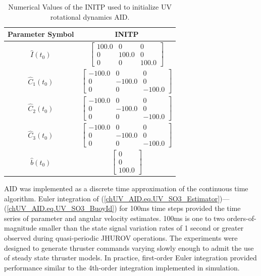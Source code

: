 \begin{table}[htbp]
\ssp
\caption{Numerical Values of the \ac{INITP} used to initialize \ac{UV} rotational dynamics \ac{AID}.}
\begin{center}
\begin{tabular}{c|c}
Parameter Symbol & \acf{INITP} \\ \hline
$\hat{I}(t_0)$ &
$ \left[\begin{array}{ccc} 100.0 & 0 & 0\\ 0 & 100.0 & 0\\ 0 & 0 & 100.0 \end{array}\right] $
\\
$\hat{C}_1(t_0)$ &
$ \left[\begin{array}{ccc} -100.0 & 0 & 0\\ 0 & -100.0 & 0\\ 0 & 0 & -100.0 \end{array}\right] $
\\
$\hat{C}_2(t_0)$ &
$ \left[\begin{array}{ccc} -100.0 & 0 & 0\\ 0 & -100.0 & 0\\ 0 & 0 & -100.0 \end{array}\right] $
\\
$\hat{C}_3(t_0)$ &
$ \left[\begin{array}{ccc} -100.0 & 0 & 0\\ 0 & -100.0 & 0\\ 0 & 0 & -100.0 \end{array}\right] $
\\
$\hat{b}(t_0)$ &
$ \left[\begin{array}{c} 0\\ 0\\ 100.0 \end{array}\right] $
\\
\end{tabular}
\end{center}
\label{chUV_AID.tb.UVSO3_INIT_params}
\end{table}



\ac{AID} was implemented as a discrete time approximation of the
continuous time algorithm.  
%
%
Euler integration of (\ref{chUV_AID.eq.UV_SO3_Estimator})---(\ref{chUV_AID.eq.UV_SO3_BuoyId})
for 100ms time steps
provided the time series of parameter and angular velocity
estimates.
%
100ms is one to two orders-of-magnitude smaller than the state signal
variation rates of 1 second or greater observed during quasi-periodic
\ac{JHUROV} operations.
%
The experiments were designed to generate thruster commands varying
slowly enough to admit the use of steady state thruster models.
%
In practice, first-order Euler integration provided performance
similar to the 4th-order integration implemented in simulation.




